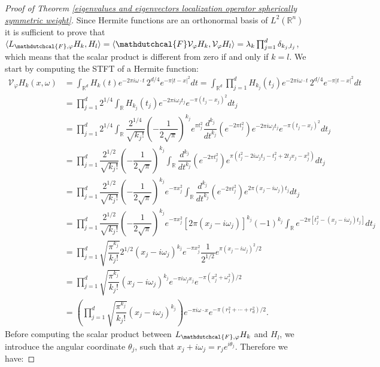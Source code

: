 \documentclass[corpo=11pt, stile=classica, tipotesi=custom,
greek, evenboxes, english]{toptesi}
\numberwithin{equation}{chapter}
\theoremstyle{definition}
\theoremstyle{remark}
\newcommand{\R}{\mathbb{R}} %
\newcommand{\V}{\mathcal{V}} %
\begin{document}
\begin{proof}[Proof of Theorem \ref{eigenvalues and eigenvectors localization operator spherically symmetric weight}]
	Since Hermite functions are an orthonormal basis of $L^2(\R^n)$ it is sufficient to prove that $\langle  L_{\mathdutchcal{F},\varphi}H_k,H_l\rangle = \langle \mathdutchcal{F} \V_{\varphi}H_k, \V_{\varphi}H_l \rangle =  \lambda_k \prod_{j=1}^d \delta_{k_j,l_j}$, which means that the scalar product is different from zero if and only if $k=l$. We start by computing the STFT of a Hermite function:
	{\allowdisplaybreaks[1]
	\begin{align}\label{STFT of Hermite functions}
		\V_{\varphi}H_k(x,\omega) &= \int_{\R^d} H_k(t) e^{-2\pi i \omega \cdot t}\, 2^{d/4} e^{-\pi|t-x|^2}dt = \int_{\R^d} \prod_{j=1}^d H_{k_j}(t_j) e^{-2\pi i \omega \cdot t}\, 2^{d/4} e^{-\pi|t-x|^2}dt \nonumber \\
		&= \prod_{j=1}^{d} 2^{1/4}\int_{\R} H_{k_j}(t_j) e^{-2\pi i \omega_j t_j} e^{-\pi(t_j-x_j)^2}dt_j \nonumber\\
		&= \prod_{j=1}^{d} 2^{1/4}\int_{\R} \dfrac{2^{1/4}}{\sqrt{k_j!}}\left(-\dfrac{1}{2\sqrt{\pi}}\right)^{k_j} e^{\pi t_j^2} \dfrac{d^{k_j}}{dt^{k_j}}\left(e^{-2\pi t_j^2}\right) e^{-2\pi i \omega_j t_j} e^{-\pi(t_j-x_j)^2}dt_j \nonumber\\
		&= \prod_{j=1}^d \dfrac{2^{1/2}}{\sqrt{k_j!}} \left(-\dfrac{1}{2\sqrt{\pi}}\right)^{k_j} \int_{\R} \dfrac{d^{k_j}}{dt^{k_j}}\left(e^{-2\pi t_j^2}\right) e^{\pi(t_j^2 - 2i\omega_j t_j -t_j^2 + 2t_j x_j - x_j^2)}dt_j \nonumber\\
		&= \prod_{j=1}^d \dfrac{2^{1/2}}{\sqrt{k_j!}} \left(-\dfrac{1}{2\sqrt{\pi}}\right)^{k_j} e^{-\pi x_j^2}\int_{\R} \dfrac{d^{k_j}}{dt^{k_j}}\left(e^{-2\pi t_j^2}\right) e^{2\pi(x_j - i\omega_j)t_j}dt_j \nonumber\\
		&= \prod_{j=1}^d \dfrac{2^{1/2}}{\sqrt{k_j!}} \left(-\dfrac{1}{2\sqrt{\pi}}\right)^{k_j} e^{-\pi x_j^2} [2\pi(x_j - i\omega_j)]^{k_j} (-1)^{k_j}\int_{\R}  e^{-2\pi[t_j^2 - (x_j - i \omega_j)t_j]} dt_j \nonumber\\
		&=\prod_{j=1}^d \sqrt{\dfrac{\pi^{k_j}}{k_j!}}2^{1/2}( x_j - i\omega_j)^{k_j} e^{-\pi x_j^2} \dfrac{1}{2^{1/2}} e^{\pi (x_j - i \omega_j)^2/2} \nonumber\\
		&= \prod_{j=1}^d \sqrt{\dfrac{\pi^{k_j}}{k_j!}} (x_j - i \omega_j)^{k_j} e^{-\pi i \omega_j x_j} e^{-\pi(x_j^2 + \omega_j^2)/2} \nonumber\\
		&= \left(\prod_{j=1}^d \sqrt{\dfrac{\pi^{k_j}}{k_j!}} (x_j - i \omega_j)^{k_j} \right) e^{-\pi i \omega \cdot x} e^{-\pi(r_1^2 + \cdots + r_d^2)/2}.
	\end{align}}
	Before computing the scalar product between $L_{\mathdutchcal{F},\varphi} H_k$ and $H_l$, we introduce the angular coordinate $\theta_j$, such that $x_j + i \omega_j = r_j e^{i\theta_j}$. Therefore we have:


\end{proof}
\end{document}
